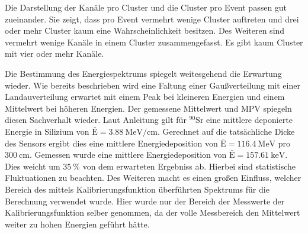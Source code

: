 Die Darstellung der Kanäle pro Cluster und die Cluster pro Event passen gut 
zueinander. Sie zeigt, dass pro Event vermehrt wenige Cluster auftreten und drei 
oder mehr Cluster kaum eine Wahrscheinlichkeit besitzen. Des Weiteren sind vermehrt 
wenige Kanäle in einem Cluster zusammengefasst. Es gibt kaum Cluster mit vier oder 
mehr Kanäle.\par 
Die Bestimmung des Energiespektrums spiegelt weitesgehend die Erwartung wieder. Wie 
bereits beschrieben wird eine Faltung einer Gaußverteilung mit einer Landauverteilung 
erwartet mit einem Peak bei kleineren Energien und einem Mittelwert bei höheren Energien.
Der gemessene Mittelwert und MPV spiegeln diesen Sachverhalt wieder. Laut 
Anleitung gilt für $^{90}\text{Sr}$ eine mittlere deponierte Energie in Silizium 
von $\bar{\text{E}} = \SI{3.88}{\mega\electronvolt\per\centi\meter}$. Gerechnet auf die 
tatsächliche Dicke des Sensors ergibt dies eine mittlere Energiedeposition 
von $\bar{\text{E}} = \SI{116.4}{\mega\electronvolt}$ pro $\SI{300}{\centi\meter}$. 
Gemessen wurde eine mittlere Energiedeposition von 
$\bar{\text{E}} = \SI{157.61}{\kilo\electronvolt}$. Dies weicht um $\SI{35}{\percent}$
von dem erwarteten Ergebniss ab. Hierbei sind statistische Fluktuationen zu 
beachten. Des Weiteren macht es einen großen Einfluss, welcher Bereich 
des mittels Kalibrierungsfunktion überführten Spektrums für die Berechnung 
verwendet wurde. Hier wurde nur der Bereich der Messwerte der Kalibrierungsfunktion 
selber genommen, da der volle Messbereich den Mittelwert weiter zu hohen Energien 
geführt hätte. 